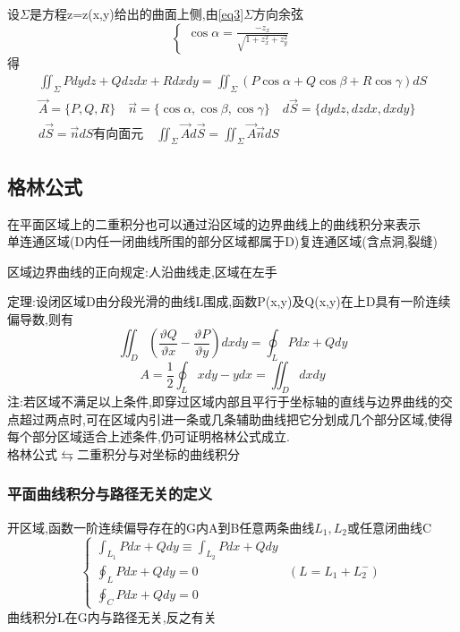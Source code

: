 \documentclass[10pt, a4paper, oneside]{ctexart}
\begin{document}
\begin{sloppypar}
	设$\Sigma$是方程z=z(x,y)给出的曲面上侧,由\eqref{eq3}$\Sigma$方向余弦$$\begin{cases}
			\cos\alpha=\frac{-z_x}{\sqrt{1+z_x^2 + z_y^2}}%
		\end{cases}$$
	得\begin{gather*}
		\iint_\Sigma Pdydz + Qdzdx  +Rdxdy =\iint_\Sigma (P\cos\alpha + Q\cos\beta + R\cos\gamma)dS\\
		\overrightarrow{A} = \lbrace P,Q,R \rbrace\quad \overrightarrow{n}= \lbrace \cos\alpha, \cos\beta, \cos\gamma \rbrace\quad d\overrightarrow{S}=\lbrace dydz, dzdx, dxdy \rbrace\\
		d\overrightarrow{S} = \overrightarrow{n}dS\text{有向面元}\quad \iint_\Sigma \overrightarrow{A}d\overrightarrow{S}=\iint_\Sigma \overrightarrow{A}\overrightarrow{n}dS
	\end{gather*}
	\subsection{格林公式}在平面区域上的二重积分也可以通过沿区域的边界曲线上的曲线积分来表示\\
	单连通区域(D内任一闭曲线所围的部分区域都属于D)复连通区域(含点洞,裂缝)

	区域边界曲线的正向规定:人沿曲线走,区域在左手

	定理:设闭区域D由分段光滑的曲线L围成,函数P(x,y)及Q(x,y)在上D具有一阶连续偏导数,则有$$
		\iint_D(\frac{\vartheta Q}{\vartheta x}-\frac{\vartheta P}{\vartheta y})dxdy=\oint_LPdx+Qdy
	$$
	$$
		A=\frac{1}{2}\oint_L xdy-ydx=\iint_D dxdy
	$$
	注:若区域不满足以上条件,即穿过区域内部且平行于坐标轴的直线与边界曲线的交点超过两点时,可在区域内引进一条或几条辅助曲线把它分划成几个部分区域,使得每个部分区域适合上述条件,仍可证明格林公式成立.\\
	格林公式$\leftrightarrows$二重积分与对坐标的曲线积分
	\subsubsection{平面曲线积分与路径无关的定义}
	开区域,函数一阶连续偏导存在的G内A到B任意两条曲线$L_1,L_2$或任意闭曲线C
	$$
		\begin{cases}
			\int_{L_1}Pdx+Qdy\equiv\int_{L_2}Pdx+Qdy &                 \\
			\oint_LPdx+Qdy=0                         & (L=L_1+L_2^{-}) \\
			\oint_CPdx+Qdy=0                         &
		\end{cases}
	$$
	曲线积分L在G内与路径无关,反之有关


\end{sloppypar}
\end{document}
